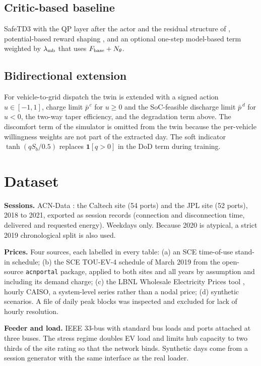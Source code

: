 \documentclass[11pt]{article}
\begin{document}
\subsection{Critic-based baseline}
SafeTD3 \cite{td3} with the QP layer after the actor and the residual structure of \cite{johannink,silverres}, potential-based reward shaping \cite{ng}, and an optional one-step model-based term weighted by $\lambda_{\rm mb}$ that uses $F_{\rm base}+N_\theta$.

\subsection{Bidirectional extension}
For vehicle-to-grid dispatch the twin is extended with a signed action $u\in[-1,1]$, charge limit $\bar p^{\,c}$ for $u\ge0$ and the SoC-feasible discharge limit $\bar p^{\,d}$ for $u<0$, the two-way taper efficiency, and the degradation term above. The discomfort term of the simulator is omitted from the twin because the per-vehicle willingness weights are not part of the extracted day. The soft indicator $\tanh(qS_b/0.5)$ replaces $\mathbf 1[q>0]$ in the DoD term during training.

\section{Dataset}\label{sec:data}
\textbf{Sessions.} ACN-Data \cite{acn}: the Caltech site (54 ports) and the JPL site (52 ports), 2018 to 2021, exported as session records (connection and disconnection time, delivered and requested energy). Weekdays only. Because 2020 is atypical, a strict 2019 chronological split is also used.

\textbf{Prices.} Four sources, each labelled in every table: (a) an SCE time-of-use stand-in schedule; (b) the SCE TOU-EV-4 schedule of March 2019 from the open-source \texttt{acnportal} package, applied to both sites and all years by assumption and including its demand charge; (c) the LBNL Wholesale Electricity Prices tool \cite{wep}, hourly CAISO, a system-level series rather than a nodal price; (d) synthetic scenarios. A file of daily peak blocks was inspected and excluded for lack of hourly resolution.

\textbf{Feeder and load.} IEEE 33-bus \cite{baranwu} with standard bus loads and ports attached at three buses. The stress regime doubles EV load and limits hub capacity to two thirds of the site rating so that the network binds. Synthetic days come from a session generator with the same interface as the real loader.
\end{document}
